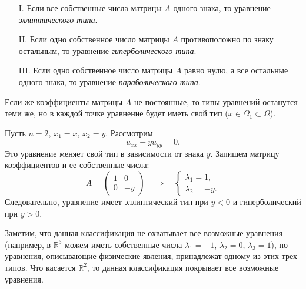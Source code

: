 \documentclass[12pt,a5paper]{book}
\begin{document}
	\begin{itemize}
		\item [I.] Если все собственные числа матрицы $A$ одного знака, то уравнение \emph{эллиптического типа}.
		\item [II.] Если одно собственное число матрицы $A$ противоположно по знаку остальным, то уравнение \emph{гиперболического типа}.
		\item [III.] Если одно собственное число матрицы $A$ равно нулю, а все остальные одного знака, то уравнение \emph{параболического типа}.
	\end{itemize}
	Если же коэффициенты матрицы $A$ не постоянные, то типы уравнений останутся теми же, но в каждой точке уравнение будет иметь свой тип ($x \in \Omega_1 \subset \Omega$).
	
	Пусть $n = 2$, $x_1 = x$, $x_2 = y$. Рассмотрим
	\begin{equation*}
		u_{xx} - yu_{yy} = 0.
	\end{equation*}
	Это уравнение меняет свой тип в зависимости от знака $y$. Запишем матрицу коэффициентов и ее собственные числа:
	\begin{equation*}
		A = \begin{pmatrix}
			1 & 0 \\
			0 & -y
		\end{pmatrix} \quad \Rightarrow \quad
		\begin{cases}
			\lambda_1 = 1, \\
			\lambda_2 = -y.
		\end{cases}
	\end{equation*}
	Следовательно, уравнение имеет эллиптический тип при $y<0$ и гиперболический при $y>0$.
	
	Заметим, что данная классификация не охватывает все возможные уравнения (например, в $\mathbb{R}^3$ можем иметь собственные числа $\lambda_{1} = -1$, $\lambda_{2} = 0$, $\lambda_{3} = 1$), но уравнения, описывающие физические явления, принадлежат одному из этих трех типов. Что касается $\mathbb{R}^2$, то данная классификация покрывает все возможные уравнения.
	
\end{document}
